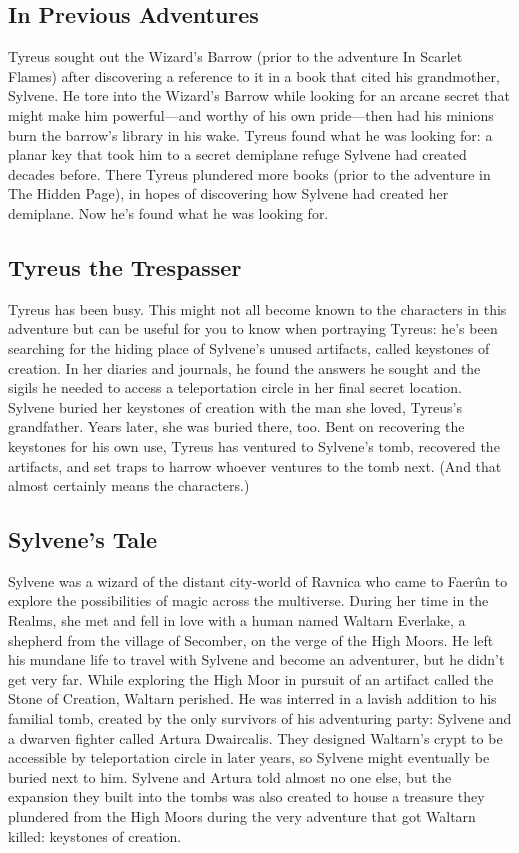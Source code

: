 \documentclass[10pt,a4paper,twoside,twocolumn,openany,bg=print,nodeprecatedcode]{dndbook}
\begin{document}
\subsection{In Previous Adventures}
Tyreus sought out the Wizard's Barrow (prior to the adventure In Scarlet Flames) after discovering a reference to it in a book that cited his grandmother, Sylvene. He tore into the Wizard's Barrow while looking for an arcane secret that might make him powerful—and worthy of his own pride—then had his minions burn the barrow's library in his wake. Tyreus found what he was looking for: a planar key that took him to a secret demiplane refuge Sylvene had created decades before. There Tyreus plundered more books (prior to the adventure in The Hidden Page), in hopes of discovering how Sylvene had created her demiplane.
Now he's found what he was looking for.
\subsection{Tyreus the Trespasser}
Tyreus has been busy. This might not all become known to the characters in this adventure but can be useful for you to know when portraying Tyreus: he's been searching for the hiding place of Sylvene's unused artifacts, called keystones of creation. In her diaries and journals, he found the answers he sought and the sigils he needed to access a teleportation circle in her final secret location. Sylvene buried her keystones of creation with the man she loved, Tyreus's grandfather. Years later, she was buried there, too.
Bent on recovering the keystones for his own use, Tyreus has ventured to Sylvene's tomb, recovered the artifacts, and set traps to harrow whoever ventures to the tomb next. (And that almost certainly means the characters.)
\subsection{Sylvene's Tale}
Sylvene was a wizard of the distant city-world of Ravnica who came to Faerûn to explore the possibilities of magic across the multiverse. During her time in the Realms, she met and fell in love with a human named Waltarn Everlake, a shepherd from the village of Secomber, on the verge of the High Moors. He left his mundane life to travel with Sylvene and become an adventurer, but he didn't get very far. While exploring the High Moor in pursuit of an artifact called the Stone of Creation, Waltarn perished.
He was interred in a lavish addition to his familial tomb, created by the only survivors of his adventuring party: Sylvene and a dwarven fighter called Artura Dwaircalis. They designed Waltarn's crypt to be accessible by teleportation circle in later years, so Sylvene might eventually be buried next to him.
Sylvene and Artura told almost no one else, but the expansion they built into the tombs was also created to house a treasure they plundered from the High Moors during the very adventure that got Waltarn killed: keystones of creation.
\end{document}
